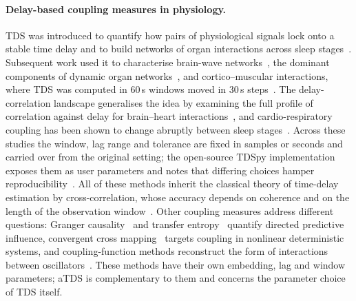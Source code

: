 \documentclass[11pt,a4paper]{article}
\begin{document}
\paragraph{Delay-based coupling measures in physiology.}
TDS was introduced to quantify how pairs of physiological signals lock onto a stable time delay and to build networks of organ interactions across sleep stages~\cite{Bashan2012NetworkPhysiology,Bartsch2015NetworkPhysiology}. Subsequent work used it to characterise brain-wave networks~\cite{Liu2015PlasticityBrain}, the dominant components of dynamic organ networks~\cite{Liu2015MajorComponent}, and cortico--muscular interactions, where TDS was computed in 60\,s windows moved in 30\,s steps~\cite{Rizzo2020NetworkPhysiology,Rizzo2022DynamicNetworks}. The delay-correlation landscape generalises the idea by examining the full profile of correlation against delay for brain--heart interactions~\cite{Lin2016DelaycorrelationLandscape}, and cardio-respiratory coupling has been shown to change abruptly between sleep stages~\cite{Bartsch2012PhaseTransitions}. Across these studies the window, lag range and tolerance are fixed in samples or seconds and carried over from the original setting; the open-source TDSpy implementation exposes them as user parameters and notes that differing choices hamper reproducibility~\cite{Steinbrinker2024TdspyOpensource}. All of these methods inherit the classical theory of time-delay estimation by cross-correlation, whose accuracy depends on coherence and on the length of the observation window~\cite{Knapp1976GeneralizedCorrelation,Carter1987CoherenceTime}. Other coupling measures address different questions: Granger causality~\cite{Granger1969InvestigatingCausal} and transfer entropy~\cite{Schreiber2000MeasuringInformation} quantify directed predictive influence, convergent cross mapping~\cite{Sugihara2012DetectingCausality} targets coupling in nonlinear deterministic systems, and coupling-function methods reconstruct the form of interactions between oscillators~\cite{Stankovski2017CouplingFunctions}. These methods have their own embedding, lag and window parameters; aTDS is complementary to them and concerns the parameter choice of TDS itself.
\end{document}

